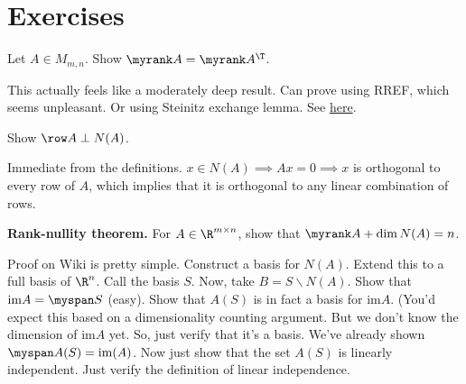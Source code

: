 

\section{Exercises}
\begin{exercise} \label{exer:rank-transpose-eqal}
  Let $A\in M_{m,n}$. Show $\myrank A = \myrank A^\T$.
\end{exercise}

\begin{solution}
  This actually feels like a moderately deep result. Can prove using RREF, which seems unpleasant. Or using Steinitz exchange lemma. See \href{https://en.wikipedia.org/wiki/Rank_(linear_algebra)#Proof_using_linear_combinations}{here}.
\end{solution}

\begin{exercise}
  Show $\row A \perp N(A)$.
\end{exercise}

\begin{solution}
Immediate from the definitions. $x\in N(A) \implies Ax = 0 \implies x$ is orthogonal to every row of $A$, which implies that it is orthogonal to any linear combination of rows. 
\end{solution}
  
\begin{exercise}
\textbf{Rank-nullity theorem.} For $A\in \R^{m\times n}$, show that $\myrank A + \dim N(A) = n$.
\end{exercise}

\begin{solution}
Proof on Wiki is pretty simple. Construct a basis for $N(A)$. Extend this to a full basis of $\R^n$. Call the basis $S$. Now, take $B = S\backslash N(A)$. Show that $\text{im} A = \myspan S$ (easy). Show that $A(S)$ is in fact a basis for $\text{im} A$. (You'd expect this based on a dimensionality counting argument. But we don't know the dimension of im$A$ yet. So, just verify that it's a basis. We've already shown $\myspan A(S) = \text{im}(A)$. Now just show that the set $A(S)$ is linearly independent. Just verify the definition of linear independence. 
\end{solution}

